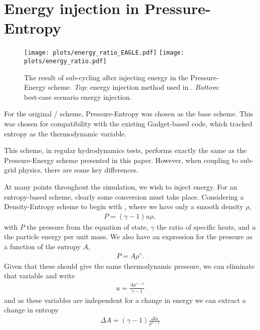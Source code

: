 \section{Energy injection in Pressure-Entropy}
\label{sec:energyinjection}

\begin{figure}
    \centering
    \texttt{[image: plots/energy\_ratio\_EAGLE.pdf]}\vspace{-0.3cm}
    \texttt{[image: plots/energy\_ratio.pdf]}
    \vspace{-0.7cm}
    \caption{The result of sub-cycling after injecting energy
    in the Pressure-Energy scheme. \emph{Top}: energy injection
    method used in \eagle{}. \emph{Bottom}: best-case scenario
    energy injection.}
    \label{fig:energyinjection}
\end{figure}

For the original \eagle{}/\anarchy{} scheme, Pressure-Entropy was chosen as
the base scheme. This was chosen for compatibility with the existing
Gadget-based code, which tracked entropy as the thermodynamic variable.

This scheme, in regular hydrodynamics tests, performs exactly the same as
the Pressure-Energy scheme presented in this paper. However, when coupling to
sub-grid physics, there are some key differences.

At many points throughout the simulation, we wish to inject energy. For an
entropy-based scheme, clearly some conversion must take place. Considering a
Density-Entropy scheme to begin with \citep{Springel2002}, where we have only
a smooth density $\rho$,
\begin{align}
    P = (\gamma - 1) u \rho,
\end{align}
with $P$ the pressure from the equation of state, $\gamma$ the ratio of specific
heats, and $u$ the particle energy per unit mass. We also have an expression for
the pressure as a function of the entropy $A$,
\begin{align}
    P = A \rho^\gamma.
\end{align}
Given that these should give the same thermodynamic pressure, we can eliminate that
variable and write
\begin{align}
    u = \frac{A \rho^{\gamma - 1}}{\gamma - 1}
\end{align}
and as these variables are independent for a change in energy we can
extract a change in entropy
\begin{align}
    \Delta A = (\gamma - 1)\frac{\Delta u}{\rho^{\gamma - 1}}
\end{align}


